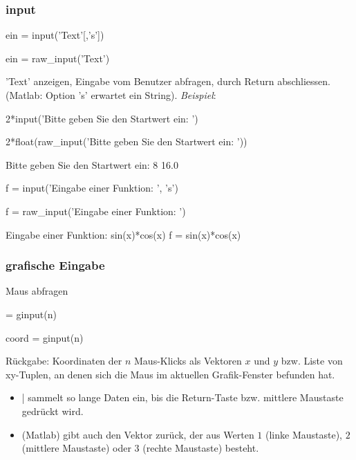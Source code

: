 \documentclass[hyperref={xetex}]{beamer}
\begin{document}
%
%
\begin{frame}[fragile]\frametitle{input}
\begin{matlabin}
ein = input('Text'[,'s'])
\end{matlabin}
\begin{pyin}
ein = raw_input('Text')  
\end{pyin}
'Text' anzeigen, Eingabe vom Benutzer abfragen, durch Return abschliessen. (Matlab: Option 's' erwartet ein String).
\textsl{Beispiel}:
\begin{matlabin}
2*input('Bitte geben Sie den Startwert ein: ')
\end{matlabin}
\begin{pyin}
2*float(raw_input('Bitte geben Sie den Startwert ein: '))
\end{pyin}
\begin{matlab}
Bitte geben Sie den Startwert ein: 8
16.0
\end{matlab}
\begin{matlabin}
f = input('Eingabe einer Funktion: ', 's')
\end{matlabin}
\begin{pyin}
f = raw_input('Eingabe einer Funktion: ')
\end{pyin}
\begin{matlab}
Eingabe einer Funktion: sin(x)*cos(x)
f = sin(x)*cos(x)
\end{matlab}
\end{frame}
%
%
\begin{frame}[fragile]\frametitle{grafische Eingabe}
Maus abfragen
\begin{matlabin}
[x,y] = ginput(n)
\end{matlabin}
\begin{pyin}
coord = ginput(n)  
\end{pyin}
Rückgabe: Koordinaten der $n$ Maus-Klicks als Vektoren $x$ und $y$ bzw. Liste von xy-Tuplen, 
an denen sich die Maus im aktuellen Grafik-Fenster befunden hat.  
\begin{itemize}
  \item {}|  sammelt so lange Daten ein, bis die
  Return-Taste bzw. mittlere Maustaste gedrückt wird.
\item {}(Matlab) gibt auch den Vektor 
  zurück, der aus Werten $1$ (linke Maustaste), $2$ (mittlere
  Maustaste) oder $3$ (rechte Maustaste) besteht. 
\end{itemize} 
\end{frame}
\end{document}
